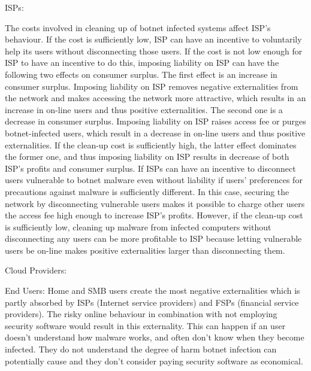 ISPs:

The costs involved in cleaning up of botnet infected systems affect ISP’s behaviour. If the cost is sufficiently low, ISP can have an incentive to voluntarily help its users without disconnecting those users. If the cost is not low enough for ISP to have an incentive to do this, imposing liability on ISP can have the following two effects on consumer surplus. The first effect is an increase in consumer surplus. Imposing liability on ISP removes negative externalities from the network and makes accessing the network more attractive, which results in an increase in on-line users and thus positive externalities. The second one is a decrease in consumer surplus. Imposing liability on ISP raises access fee or purges botnet-infected users, which result in a decrease in on-line users and thus positive externalities. If the clean-up cost is sufficiently high, the latter effect dominates the former one, and thus imposing liability on ISP results in decrease of both ISP’s profits and consumer surplus. If ISPs can have an incentive to disconnect users vulnerable to botnet malware even without liability if users’ preferences for precautions against malware is sufficiently different. In this case, securing the network by disconnecting vulnerable users makes it possible to charge other users the access fee high enough to increase ISP’s profits. However, if the clean-up cost is sufficiently low, cleaning up malware from infected computers without disconnecting any users can be more profitable to ISP because letting vulnerable users be on-line makes positive externalities larger than disconnecting them.

Cloud Providers:



End Users:
Home and SMB users create the most negative externalities which is partly absorbed by ISPs (Internet service providers) and FSPs (financial service providers). The risky online behaviour in combination with not employing security software would result in this externality. This can happen  if an user doesn’t understand how malware works, and often don’t know when they become infected. They do not understand the degree of harm botnet infection can potentially cause and they don't consider paying security software as economical. 
